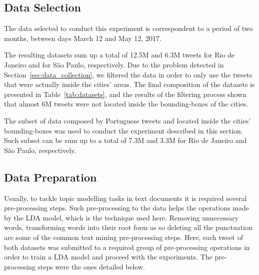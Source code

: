 \subsection{Data Selection}
The data selected to conduct this experiment is correspondent to a period of two months, between days March 12 and May 12, 2017. 

The resulting datasets sum up a total of 12.5M and 6.3M tweets for Rio de Janeiro and for São Paulo, respectively. Due to the problem detected in Section~\ref{sec:data_collection}, we filtered the data in order to only use the tweets that were actually inside the cities' areas. The final composition of the datasets is presented in Table~\ref{tab:datasets}, and the results of the filtering process shown that almost 6M tweets were not located inside the bounding-boxes of the cities.

\begin{table}[ht]
\small
\centering
\caption{Datasets composition}
\label{tab:datasets}
\end{table}

The subset of data composed by Portuguese tweets and located inside the cities' bounding-boxes was used to conduct the experiment described in this section. Such subset can be sum up to a total of 7.3M and 3.3M for Rio de Janeiro and São Paulo, respectively.

\subsection{Data Preparation}
Usually, to tackle topic modelling tasks in text documents it is required several pre-processing steps. Such pre-processing to the data helps the operations made by the LDA model, which is the technique used here. Removing unnecessary words, transforming words into their root form as so deleting all the punctuation are some of the common text mining pre-processing steps. Here, each tweet of both datasets was submitted to a required group of pre-processing operations in order to train a LDA model and proceed with the experiments. The pre-processing steps were the ones detailed below.

